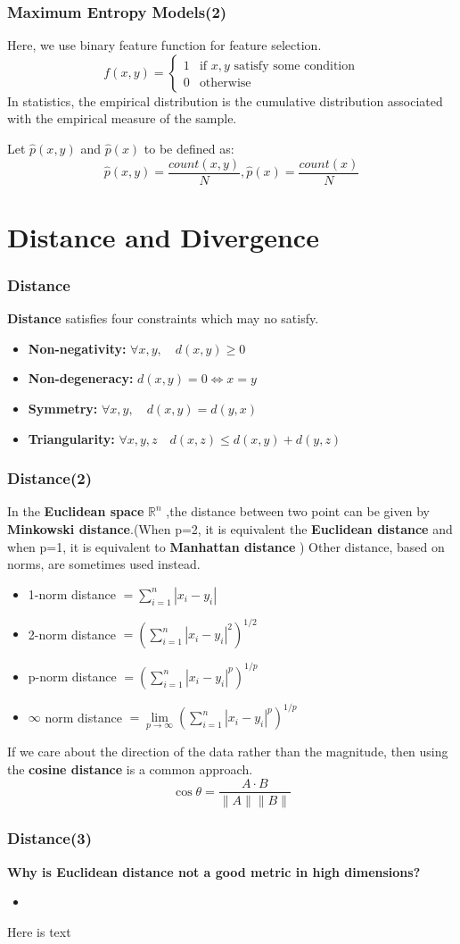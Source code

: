 \documentclass[slidestop,compress,mathserif]{beamer}
\begin{document}
	\begin{frame}
		\frametitle{Maximum Entropy Models(2)}
		Here, we use binary feature function for feature selection.
		$$f(x,y)=\left\{
		\begin{array}{ll}
		1  &\mbox{if $x,y$ satisfy some condition}\\
		0  &\mbox{otherwise}
		\end{array}
		\right.
		$$
		In statistics, the empirical distribution is the cumulative distribution associated with the empirical measure of the sample.
		
		Let $\hat{p}(x,y)$ and $\hat{p}(x)$ to be defined as:
		$$\hat{p}(x,y) = \frac{count(x,y)}{N},\hat{p}(x) = \frac{count(x)}{N}$$
	\end{frame}
	\section{Distance and Divergence}
	\begin{frame}
		\frametitle{Distance}
		\textbf{Distance} satisfies four constraints which  may no satisfy.
		\begin{itemize}
			\item \textbf{Non-negativity:} $\forall x,y,\quad d(x,y) \ge 0$
			\item \textbf{Non-degeneracy:} $d(x,y)=0 \Leftrightarrow x=y$
			\item \textbf{Symmetry:} $\forall x,y, \quad d(x,y)=d(y,x)$
			\item \textbf{Triangularity:} $\forall x,y,z \quad d(x,z)\leq d(x,y)+d(y,z)$
		\end{itemize}
		\begin{figure}
		\end{figure}	
	\end{frame}
	
	\begin{frame}
		\frametitle{Distance(2)}
		In the \textbf{Euclidean space} $\mathbb{R}^n$ ,the distance between two point can be given by \textbf{Minkowski distance}.(When p=2, it is equivalent the \textbf{Euclidean distance} and when p=1, it is equivalent to \textbf{Manhattan distance} ) Other distance, based on norms, are sometimes used instead.
		\begin{itemize}
			\item 1-norm distance  $= \sum_{i=1}^{n}|x_i-y_i|$
			\item 2-norm distance  $= \left(\sum_{i=1}^{n}|x_i-y_i|^2\right)^{1/2}$
			\item p-norm distance  $=  \left(\sum_{i=1}^{n}|x_i-y_i|^p\right)^{1/p}$
			\item $\infty$ norm distance $=\lim\limits_{p\rightarrow\infty}\left(\sum_{i=1}^{n}|x_i-y_i|^p\right)^{1/p}$
		\end{itemize}
		If we care about the direction of the data rather than the magnitude, then using the \textbf{cosine distance} is a common approach. 
		$$\cos \theta = \frac{A\cdot B}{\|A\|\|B\|}$$
	\end{frame}
	
	\begin{frame}
		\frametitle{Distance(3)}
		\textbf{Why is Euclidean distance not a good metric in high dimensions?}
		\begin{itemize}
			\item 
		\end{itemize}
		Here is text
		\fullcite{Domingos}

	\end{frame}
\end{document}
